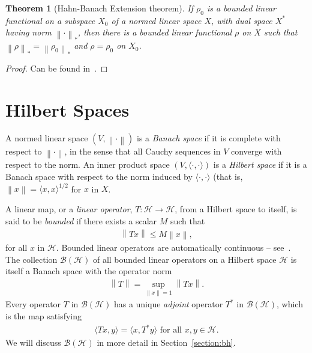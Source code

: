 \documentclass[11pt,a4paper]{report}
\theoremstyle{plain}
\newtheorem*{thm*}{Theorem}
\theoremstyle{definition}
\newcommand{\1}{\mathbbm{1}}
\renewcommand{\H}{\mathcal{H}}
\newcommand{\B}{\mathcal{B}}
\newcommand{\BH}{\mathcal{\B(\H)}}
\begin{document}
\begin{thm*}[Hahn-Banach Extension theorem] 
	If $\rho_0$ is a bounded linear functional on a subspace $X_0$ of a normed 
	linear space $X$, with dual space $X^\ast$ having norm $\left\|\cdot\right\|_\ast$, 
	then there is a bounded linear functional $\rho$ on $X$ such that 
 	$\left\|\rho\right\|_\ast=\left\|\rho_0\right\|_\ast$ and $\rho=\rho_0$ on $X_0$.
\end{thm*}
\begin{proof}
	Can be found in~\cite[Theorem 1.6.1, p.~44]{kadison83}.
\end{proof}

\section{Hilbert Spaces}\label{section:hscons}
A normed linear space $(V,\left\|\cdot\right\|)$ is a \emph{Banach space} if it 
is complete with respect to $\left\|\cdot\right\|$, in the sense that all Cauchy 
sequences in $V$ converge with respect to the norm. An inner product space 
$(V,\langle\cdot,\cdot\rangle)$ is a \emph{Hilbert space} if it is a Banach 
space with respect to the norm induced by $\langle\cdot,\cdot\rangle$ (that is,
$\left\|x\right\| = \langle x,x\rangle^{1/2}$ for $x$ in $X$.

A linear map, or a \emph{linear operator}, $T:\H\to\H$, from a Hilbert space to 
itself, is said to be \emph{bounded} if there exists a scalar $M$ such that 
\begin{align*}
	\left\|Tx\right\| \leq M \left\|x\right\|,
\end{align*}
for all $x$ in $\H$. Bounded linear operators are automatically continuous -- 
see~\cite[1.32]{rudin91}. The collection $\BH$ of all bounded linear operators 
on a Hilbert space $\H$ is itself a Banach space with the operator norm 
\begin{align*}
	 \left\| T \right\| = \sup_{\|x\|=1} \left \|  Tx \right\|.
\end{align*}
Every operator $T$ in $\BH$ has a unique \emph{adjoint} operator $T^\ast$ in 
$\BH$, which is the map satisfying 
\begin{align*}
	\langle Tx , y \rangle = \langle x,T^\ast y \rangle \mbox{ for all } x,y \in \H.
\end{align*}
We will discuss $\BH$ in more detail in Section~\ref{section:bh}. 
\end{document}
